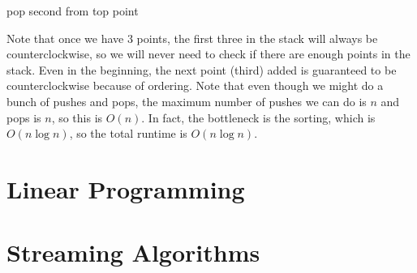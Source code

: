 \documentclass{article}
\begin{document}
\begin{example}
\begin{algorithm}[H]
\begin{algorithmic}
              \State pop second from top point 
            \EndWhile
          \EndFor 
          \State {} 
        \EndFunction
      \end{algorithmic}
    \end{algorithm}
    Note that once we have 3 points, the first three in the stack will always be counterclockwise, so we will never need to check if there are enough points in the stack. Even in the beginning, the next point (third) added is guaranteed to be counterclockwise because of ordering. Note that even though we might do a bunch of pushes and pops, the maximum number of pushes we can do is $n$ and pops is $n$, so this is $O(n)$. In fact, the bottleneck is the sorting, which is $O(n \log{n})$, so the total runtime is $O(n \log{n})$. 
  \end{example}

\section{Linear Programming}

\section{Streaming Algorithms}

  \begin{algo}
    
    \begin{algorithm}[H]
      \caption{}
      \label{alg:majority_vote}
      \begin{algorithmic}
        \Require{}
        \State 
        \EndFunction
      \end{algorithmic}
    \end{algorithm}
  \end{algo}

  \begin{algo}
    
    \begin{algorithm}[H]
      \caption{}
      \label{alg:median_track}
      \begin{algorithmic}
        \Require{}
        \State 
        \EndFunction
      \end{algorithmic}
    \end{algorithm}
  \end{algo}
\end{document}
